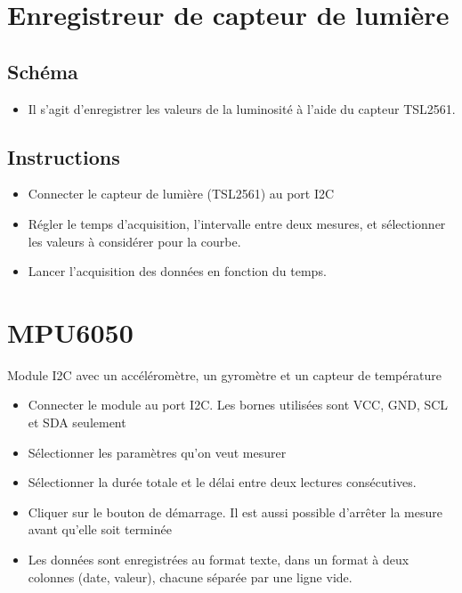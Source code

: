 \documentclass[a4paper,12pt,french]{sphinxmanual}
\let\sphinxpxdimen\pdfpxdimen\else\newdimen\sphinxpxdimen
\begin{document}
\section{Enregistreur de capteur de lumière}
\label{\detokenize{6.91:enregistreur-de-capteur-de-lumiere}}\label{\detokenize{6.91::doc}}

\subsection{Schéma}
\label{\detokenize{6.91:schema}}\begin{itemize}
\item {} 
Il s’agit d’enregistrer les valeurs de la luminosité à l’aide du capteur TSL2561.

\end{itemize}


\subsection{Instructions}
\label{\detokenize{6.91:instructions}}\begin{itemize}
\item {} 
Connecter le capteur de lumière (TSL2561) au port I2C

\item {} 
Régler le temps d’acquisition, l’intervalle entre deux mesures, et sélectionner les valeurs à considérer pour la courbe.

\item {} 
Lancer l’acquisition des données en fonction du temps.

\end{itemize}


\section{MPU6050}
\label{\detokenize{6.92:mpu6050}}\label{\detokenize{6.92::doc}}
\noindent\sphinxincludegraphics[width=300\sphinxpxdimen]{{MPU6050}.pdf}

Module I2C avec un accéléromètre, un gyromètre et un capteur de température
\begin{itemize}
\item {} 
Connecter le module au port I2C. Les bornes utilisées sont VCC, GND, SCL et SDA seulement

\item {} 
Sélectionner les paramètres qu’on veut mesurer

\item {} 
Sélectionner la durée totale et le délai entre deux lectures consécutives.

\item {} 
Cliquer sur le bouton de démarrage. Il est aussi possible d’arrêter la mesure avant qu’elle soit terminée

\item {} 
Les données sont enregistrées au format texte, dans un format à deux colonnes (date, valeur), chacune séparée par une ligne vide.

\end{itemize}
\end{document}

